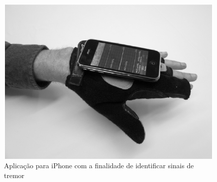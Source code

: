 \begin{figure}
 \centering
 \includegraphics[scale=0.3]{./img/moyne-iphone.png}
\caption[Aplicação para \textit{smartphone} com a finalidade de identificar sinais de tremor]{Aplicação para iPhone com a finalidade de identificar sinais de tremor ~\cite{lemoyne2010}}
 \label{fig:iphone-tremor}
\end{figure}
























